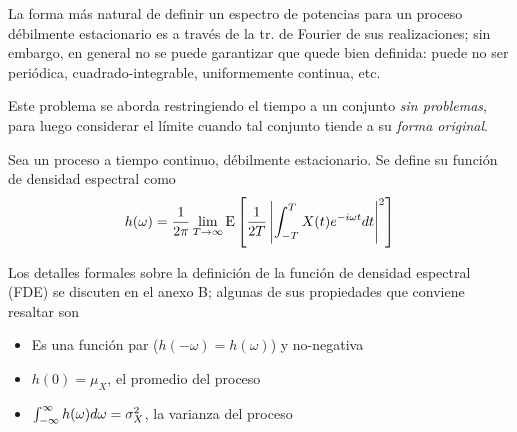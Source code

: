 La forma más natural de definir un espectro de potencias para un proceso débilmente estacionario 
es a través de la tr. de Fourier de sus realizaciones; sin embargo, en general no se puede 
garantizar que quede bien definida: puede no ser periódica, cuadrado-integrable, uniformemente 
continua, etc.

Este problema se aborda restringiendo el tiempo a un conjunto \textit{sin problemas}, para luego
considerar el límite cuando tal conjunto tiende a su \textit{forma original}.
%

\begin{definicion}
Sea \xt un proceso a tiempo continuo, débilmente estacionario. Se define su
función de densidad espectral como
\begin{equation*}
h(\omega) = \frac{1}{2 \pi} \lim_{T\rightarrow \infty} \mathrm{E}\left[  \frac{1}{2T} 
\left|  \int_{-T}^{T} X(t) e^{-i \omega t} dt \right|^{2}  \right]
\end{equation*}
\end{definicion}


%

Los detalles formales sobre la definición de la función de densidad espectral (FDE) se discuten en 
el anexo B; algunas de sus propiedades que conviene resaltar son 
\begin{itemize}
\item Es una función par ($h(-\omega) = h(\omega)$) y no-negativa
\item $h(0) = \mu_X$, el promedio del proceso
\item $\int_{-\infty}^{\infty} h(\omega) d\omega = \sigma^{2}_X$, la varianza del proceso
\end{itemize}

